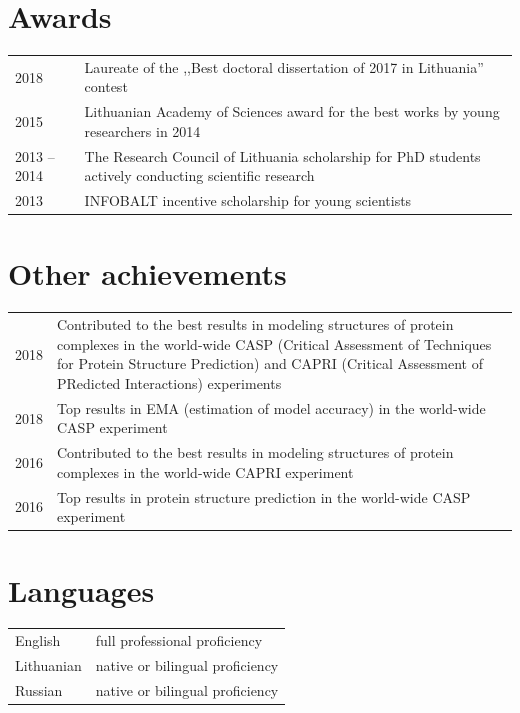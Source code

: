 \documentclass{article}
\begin{document}
\section*{Awards}
\begin{tabular}{p{}p{}}
2018 & Laureate of the ,,Best doctoral dissertation of 2017 in Lithuania'' contest \\
2015 & Lithuanian Academy of Sciences award for the best works by young researchers in 2014 \\
2013 -- 2014 & The Research Council of Lithuania scholarship for PhD students actively conducting scientific research \\
2013 & INFOBALT incentive scholarship for young scientists
\end{tabular}


\section*{Other achievements}
\begin{tabular}{p{}p{}}
2018 & Contributed to the best results in modeling structures of protein complexes
       in the world-wide CASP (Critical Assessment of Techniques for Protein Structure Prediction)
       and CAPRI (Critical Assessment of PRedicted Interactions) experiments \\
2018 & Top results in EMA (estimation of model accuracy)
       in the world-wide CASP experiment \\
2016 & Contributed to the best results in modeling structures of protein complexes
       in the world-wide CAPRI experiment \\
2016 & Top results in protein structure prediction
       in the world-wide CASP experiment
\end{tabular}


\section*{Languages}
\begin{tabular}{p{}p{}}
English        & full professional proficiency \\
Lithuanian     & native or bilingual proficiency \\
Russian        & native or bilingual proficiency
\end{tabular}
\end{document}
